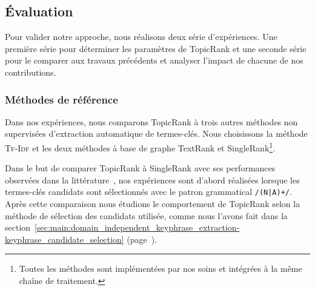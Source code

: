     \subsection{Évaluation}
    \label{subsec:main:domain_independent_keyphrase_extraction-unsupervised_automatic_keyphrase_extraction-evaluation}
      Pour valider notre approche, nous réalisons deux série d'expériences. Une
      première série pour déterminer les paramètres de TopicRank et
      une seconde série pour le comparer aux travaux précédents et analyser
      l'impact de chacune de nos contributions.
      
      \subsubsection{Méthodes de référence}
      \label{subsubsec:main:domain_independent_keyphrase_extraction-unsupervised_automatic_keyphrase_extraction-evaluation-baselines}
        Dans nos expériences, nous comparons TopicRank à trois autres
        méthodes non supervisées d'extraction automatique de termes-clés. Nous
        choisissons la méthode \textsc{Tf-Idf} et les deux méthodes à base de
        graphe TextRank et SingleRank\footnote{Toutes les méthodes sont
        implémentées par nos soins et intégrées à la même chaîne de
        traitement.}.
        
        Dans le but de comparer TopicRank à SingleRank avec ses performances
        observées dans la littérature~\cite{hassan2010conundrums}, nos
        expériences sont d'abord réalisées lorsque les termes-clés candidats
        sont sélectionnés avec le patron grammatical \texttt{/(N|A)+/}. Après
        cette comparaison nous étudions le comportement de TopicRank selon la
        méthode de sélection des candidats utilisée, comme nous l'avons fait
        dans la
        section~\ref{sec:main:domain_independent_keyphrase_extraction-keyphrase_candidate_selection}
        (page~\pageref{sec:main:domain_independent_keyphrase_extraction-keyphrase_candidate_selection}).

